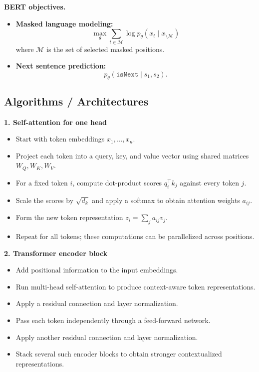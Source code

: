 \documentclass[11pt]{article}
\begin{document}
\textbf{BERT objectives.}
\begin{itemize}
    \item \textbf{Masked language modeling:}
    \[
    \max_\theta \sum_{t \in \mathcal{M}} \log p_\theta(x_t \mid x_{\setminus \mathcal{M}})
    \]
    where \(\mathcal{M}\) is the set of selected masked positions.
    \item \textbf{Next sentence prediction:}
    \[
    p_\theta(\texttt{isNext} \mid s_1, s_2).
    \]
\end{itemize}

\subsection{Algorithms / Architectures}
\textbf{1. Self-attention for one head}
\begin{itemize}
    \item Start with token embeddings \(x_1, \dots, x_n\).
    \item Project each token into a query, key, and value vector using shared matrices \(W_Q, W_K, W_V\).
    \item For a fixed token \(i\), compute dot-product scores \(q_i^\top k_j\) against every token \(j\).
    \item Scale the scores by \(\sqrt{d_k}\) and apply a softmax to obtain attention weights \(a_{ij}\).
    \item Form the new token representation \(z_i = \sum_j a_{ij} v_j\).
    \item Repeat for all tokens; these computations can be parallelized across positions.
\end{itemize}

\textbf{2. Transformer encoder block}
\begin{itemize}
    \item Add positional information to the input embeddings.
    \item Run multi-head self-attention to produce context-aware token representations.
    \item Apply a residual connection and layer normalization.
    \item Pass each token independently through a feed-forward network.
    \item Apply another residual connection and layer normalization.
    \item Stack several such encoder blocks to obtain stronger contextualized representations.
\end{itemize}
\end{document}
